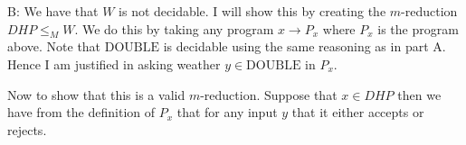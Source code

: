 \documentclass[11pt,twoside]{article}
\begin{document}
B: We have that $W$ is not decidable. I will show this by creating the $m$-reduction $DHP\leq_M W$. We do this by taking any program $x\to P_x$ where $P_x$ is the program above. Note that $\mathrm{DOUBLE}$ is decidable using the same reasoning as in part A. Hence I am justified in asking weather $y\in \mathrm{DOUBLE}$ in $P_x$.

Now to show that this is a valid $m$-reduction. Suppose that $x\in DHP$ then we have from the definition of $P_x$ that for any input $y$ that it either accepts or rejects.
\end{document}
